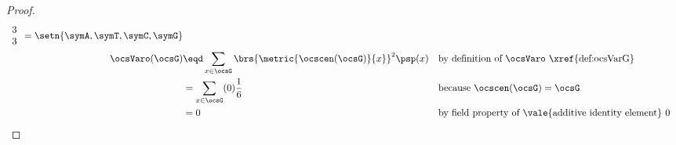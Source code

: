 \begin{tabstr}{0.75}
\begin{proof}
\begin{align*}
{{\begin{array}{c}
           3\\
           3  
         \end{array}}
     = \setn{\symA,\symT,\symC,\symG}}
    \\
  \ocsVaro(\ocsG)
    &\eqd \sum_{x\in\ocsG}\brs{\metric{\ocscen(\ocsG)}{x}}^2\psp(x)
    && \text{by definition of $\ocsVaro$ \xref{def:ocsVarG}}
  \\&= \sum_{x\in\ocsG}(0)\frac{1}{6}
    && \text{because $\ocscen(\ocsG)=\ocsG$}
  \\&= 0
    && \text{by field property of \vale{additive identity element} $0$}
\end{align*}
\end{proof}


%

\end{tabstr}

